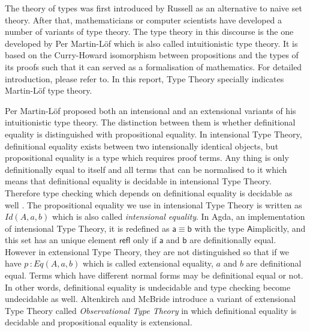 \documentclass{article}
\newcommand{\Conid}[1]{\mathit{#1}}
\newcommand{\Varid}[1]{\mathit{#1}}
\renewcommand\Varid[1]{\mathord{\textsf{#1}}}
\let\Conid\Varid
\theoremstyle{definition}
\newcommand{\todo}[1]{\textcolor{red}{TO~DO:~#1}}
\newcommand{\itt}{intensional Type Theory}
\newcommand{\ett}{extensional Type Theory}
\newcommand{\mltt}{Martin-L\"{o}f type theory}
\begin{document}
The theory of types was first introduced by Russell \cite{rus:1903} as
an alternative to naive set theory. After that, mathematicians or
computer scientists have developed a number of variants of type
theory. The type theory in this discourse is the one developed by Per
Martin-L\"{o}f \cite{per:71,per:82} which is also called
intuitionistic type theory. It is based on the Curry-Howard
isomorphism between propositions and the types of its proofs such that
it can served as a formalisation of mathematics. For detailed
introduction, please refer to\cite{nor:00}. In this report, Type
Theory specially indicates \mltt{}.


Per Martin-L\"{o}f proposed both an intensional and an extensional
variants of his intuitionistic type theory. The distinction between them is whether definitional equality is distinguished with
propositional equality. In \itt{}, definitional equality exists
between two intensionally identical objects, but propositional
equality is a type which requires proof terms. Any thing is only
definitionally equal to itself and all terms that can be normalised to
it which means that definitional equality is decidable in \itt{}. Therefore type checking which
depends on definitional equality is decidable as well  \cite{alt:99}
. The propositional equality we use in \itt{} is written
as $Id(A,a,b)$ \cite{nor:90} which is also called
\emph{intensional equality}. In Agda, an implementation of \itt{},  it is
redefined as \ensuremath{\Varid{a}\;\Varid{≡}\;\Varid{b}} with the type \ensuremath{\Conid{A}}implicitly, and this set has an
unique element \ensuremath{\Varid{refl}} only if \ensuremath{\Varid{a}} and \ensuremath{\Varid{b}} are definitionally equal. However
in \ett{}, they are not distinguished so that if we have $p \,\colon Eq
(A,a,b)$ which is called extensional equality, $a$ and $b$ are
definitional equal. Terms which have different normal forms may be
definitional equal or not. In other words, definitional equality is
undecidable and type checking become undecidable as well.
Altenkirch and McBride \cite{alt:06} introduce a variant of \ett{} called
\emph{Observational Type Theory} in which definitional equality is
decidable and propositional equality is extensional.



\end{document}
